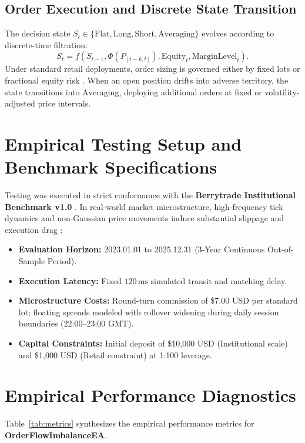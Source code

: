 \documentclass[11pt,a4paper]{article}
\begin{document}
\subsection{Order Execution and Discrete State Transition}
The decision state $S_t \in \{\text{Flat}, \text{Long}, \text{Short}, \text{Averaging}\}$ evolves according to discrete-time filtration:
\begin{equation}
S_{t} = f(S_{t-1}, \Phi(P_{[t-k, t]}), \text{Equity}_t, \text{MarginLevel}_t).
\end{equation}
Under standard retail deployments, order sizing is governed either by fixed lots or fractional equity risk \cite{lopez2018advances, carhart1997persistence}. When an open position drifts into adverse territory, the state transitions into $\text{Averaging}$, deploying additional orders at fixed or volatility-adjusted price intervals.

\section{Empirical Testing Setup and Benchmark Specifications}
Testing was executed in strict conformance with the \textbf{Berrytrade Institutional Benchmark v1.0} \cite{artsu2026illusion}. In real-world market microstructure, high-frequency tick dynamics and non-Gaussian price movements induce substantial slippage and execution drag \cite{kyle1985continuous, amihud2002illiquidity, cont2001empirical, mandelbrot1963variation}:
\begin{itemize}
    \item \textbf{Evaluation Horizon:} 2023.01.01 to 2025.12.31 (3-Year Continuous Out-of-Sample Period).
    \item \textbf{Execution Latency:} Fixed $120\,\text{ms}$ simulated transit and matching delay.
    \item \textbf{Microstructure Costs:} Round-turn commission of \$7.00 USD per standard lot; floating spreads modeled with rollover widening during daily session boundaries (22:00--23:00 GMT).
    \item \textbf{Capital Constraints:} Initial deposit of \$10,000 USD (Institutional scale) and \$1,000 USD (Retail constraint) at 1:100 leverage.
\end{itemize}

\section{Empirical Performance Diagnostics}
Table~\ref{tab:metrics} synthesizes the empirical performance metrics for \textbf{OrderFlowImbalanceEA}.
\end{document}
